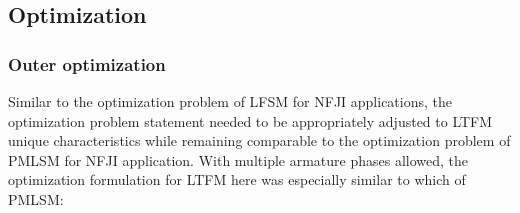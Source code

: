         
        
        \subsection{Optimization}                   \label{Chapter:RSM/LTFM/Optimization}
        
        
            \subsubsection{Outer optimization}         \label{Chapter:RSM/LTFM/Optimization/Outer}
    
            
                Similar to the optimization problem of \acs{LFSM} for \acs{NFJI} applications, the optimization problem statement needed to be appropriately adjusted to \acs{LTFM} unique characteristics while remaining comparable to the optimization problem of \acs{PMLSM} for \acs{NFJI} application. With multiple armature phases allowed, the optimization formulation for \acs{LTFM} here was especially similar to which of \acs{PMLSM}:
                
